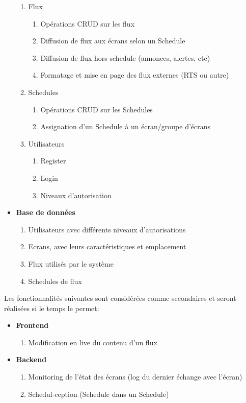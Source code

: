 \documentclass[french]{article}
\begin{document}
\begin{itemize}
\begin{enumerate}
		\item Flux
		\begin{enumerate}
			\item Opérations CRUD sur les flux
			\item Diffusion de flux aux écrans selon un Schedule
			\item Diffusion de flux hors-schedule (annonces, alertes, etc)
			\item Formatage et mise en page des flux externes (RTS ou autre)
		\end{enumerate}
		\item Schedules
		\begin{enumerate}
			\item Opérations CRUD sur les Schedules
			\item Assignation d'un Schedule à un écran/groupe d'écrans
		\end{enumerate}
		\item Utilisateurs
		 \begin{enumerate}
			\item Register 
			\item Login 
			\item Niveaux d'autorisation
		\end{enumerate}
	\end{enumerate}
	
	\item \textbf{Base de données}
	\begin{enumerate}
		\item Utilisateurs avec différents niveaux d'autorisations
		\item Ecrans, avec leurs caractéristiques et emplacement
		\item Flux utilisés par le système
		\item Schedules de flux \newline
	\end{enumerate}
\end{itemize}

Les fonctionnalités suivantes sont considérées comme secondaires et seront réalisées si le temps le permet:
\begin{itemize}
	\item \textbf{Frontend}
	\begin{enumerate}
		\item Modification en live du contenu d'un flux
	\end{enumerate}
	\item \textbf{Backend}
	\begin{enumerate}
		\item Monitoring de l'état des écrans (log du dernier échange avec l'écran)
		\item Schedul-ception (Schedule dans un Schedule)
	\end{enumerate}
\end{itemize}
\end{document}
